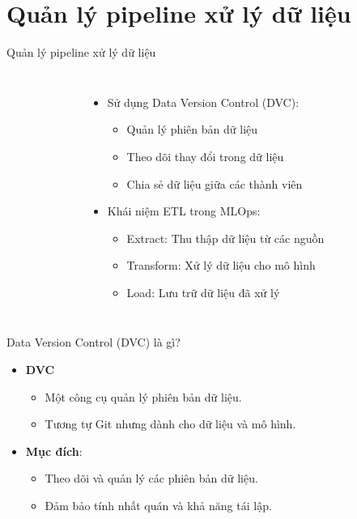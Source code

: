 \documentclass{beamer}
\begin{document}
\section{Quản lý pipeline xử lý dữ liệu}

\begin{frame}{Quản lý pipeline xử lý dữ liệu}
    \begin{columns}
        \begin{figure}
            \centering
        \end{figure}
        \begin{itemize}
            \item Sử dụng Data Version Control (DVC):
            \begin{itemize}
                \item Quản lý phiên bản dữ liệu
                \item Theo dõi thay đổi trong dữ liệu
                \item Chia sẻ dữ liệu giữa các thành viên
            \end{itemize}
            \item Khái niệm ETL trong MLOps:
            \begin{itemize}
                \item Extract: Thu thập dữ liệu từ các nguồn
                \item Transform: Xử lý dữ liệu cho mô hình
                \item Load: Lưu trữ dữ liệu đã xử lý
            \end{itemize}
        \end{itemize}
    \end{columns}
\end{frame}

\begin{frame}{Data Version Control (DVC) là gì?}
    \begin{itemize}
        \item \textbf{DVC}
        \begin{itemize}
            \item Một công cụ quản lý phiên bản dữ liệu.
            \item Tương tự Git nhưng dành cho dữ liệu và mô hình.
        \end{itemize}
        \item \textbf{Mục đích}:
        \begin{itemize}
            \item Theo dõi và quản lý các phiên bản dữ liệu.
            \item Đảm bảo tính nhất quán và khả năng tái lập.
        \end{itemize}
    \end{itemize}
\end{frame}
\end{document}
